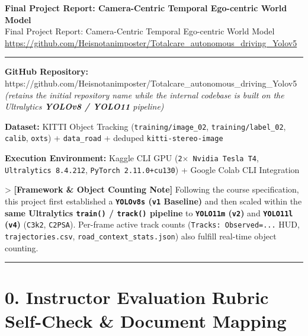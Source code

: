 \documentclass[10.5pt,a4paper]{article}
\begin{document}
\begin{center}
{\LARGE\bfseries Final Project Report: Camera-Centric Temporal Ego-centric World Model}\\[6pt]
{\normalsize\color{gray} Final Project Report: Camera-Centric Temporal Ego-centric World Model}\\[4pt]
{\small\href{https://github.com/Heisnotanimposter/Totalcare_autonomous_driving_Yolov5}{https://github.com/Heisnotanimposter/Totalcare\_autonomous\_driving\_Yolov5}}
\end{center}
\vspace{4pt}
\hrule
\vspace{8pt}

\textbf{GitHub Repository:} https:\allowbreak{}/\allowbreak{}/\allowbreak{}github.\allowbreak{}com/\allowbreak{}Heisnotanimposter/\allowbreak{}Totalcare\_\allowbreak{}autonomous\_\allowbreak{}driving\_\allowbreak{}Yolov5 \textit{(retains the initial repository name while the internal codebase is built on the Ultralytics \textbf{YOLOv8 / YOLO11} pipeline)}

\textbf{Dataset:} KITTI Object Tracking (\texttt{training/\allowbreak{}image\_\allowbreak{}02}, \texttt{training/\allowbreak{}label\_\allowbreak{}02}, \texttt{calib}, \texttt{oxts}) + \texttt{data\_\allowbreak{}road} + deduped \texttt{kitti-\allowbreak{}stereo-\allowbreak{}image}

\textbf{Execution Environment:} Kaggle CLI GPU (\texttt{2$\times$ Nvidia Tesla T4}, \texttt{Ultralytics 8.\allowbreak{}4.\allowbreak{}212}, \texttt{PyTorch 2.\allowbreak{}11.\allowbreak{}0+cu130}) + Google Colab CLI Integration


> \textbf{[Framework \& Object Counting Note]} Following the course specification, this project first established a \textbf{\texttt{YOLOv8s} (\texttt{v1} Baseline)} and then scaled within the \textbf{same Ultralytics \texttt{train()} / \texttt{track()} pipeline} to \textbf{\texttt{YOLO11m} (\texttt{v2})} and \textbf{\texttt{YOLO11l} (\texttt{v4})} (\texttt{C3k2}, \texttt{C2PSA}). Per-frame active track counts (\texttt{Tracks:\allowbreak{} Observed=.\allowbreak{}.\allowbreak{}.\allowbreak{}} HUD, \texttt{trajectories.\allowbreak{}csv}, \texttt{road\_\allowbreak{}context\_\allowbreak{}stats.\allowbreak{}json}) also fulfill real-time object counting.


\par\noindent\rule{\textwidth}{0.4pt}\par\medskip

\section{0. Instructor Evaluation Rubric Self-Check \& Document Mapping}
\end{document}
